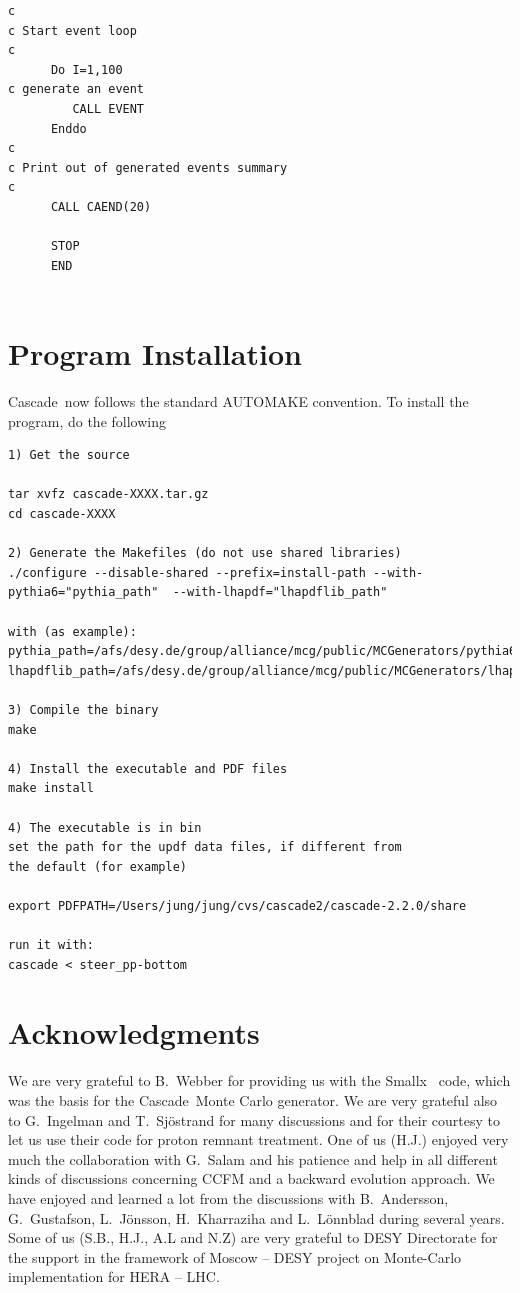 \documentclass[11pt]{article} \usepackage{mystyle-new}
\def\CASCADE{{\sc Cascade}}
\def\SMALLX{{\sc Smallx}}
\begin{document}
\begin{tiny}
\begin{verbatim}
c 
c Start event loop
c 
      Do I=1,100
c generate an event
         CALL EVENT
      Enddo
c 
c Print out of generated events summary
c 
      CALL CAEND(20)

      STOP
      END
             
\end{verbatim}
\end{tiny}
%   
\section{Program Installation}
\CASCADE\ now follows the standard AUTOMAKE
convention. To install the program, do the following
\begin{tiny}
\begin{verbatim}
1) Get the source

tar xvfz cascade-XXXX.tar.gz
cd cascade-XXXX

2) Generate the Makefiles (do not use shared libraries)
./configure --disable-shared --prefix=install-path --with-pythia6="pythia_path"  --with-lhapdf="lhapdflib_path"

with (as example):
pythia_path=/afs/desy.de/group/alliance/mcg/public/MCGenerators/pythia6/422/i586_rhel40
lhapdflib_path=/afs/desy.de/group/alliance/mcg/public/MCGenerators/lhapdf/5.8.1/i586_rhel40

3) Compile the binary
make

4) Install the executable and PDF files
make install 

4) The executable is in bin
set the path for the updf data files, if different from 
the default (for example)

export PDFPATH=/Users/jung/jung/cvs/cascade2/cascade-2.2.0/share

run it with:
cascade < steer_pp-bottom

\end{verbatim}
\end{tiny}
\section{Acknowledgments}
We are very grateful to B.~Webber for providing us with the \SMALLX~
code, which was the basis for the \CASCADE\ Monte Carlo generator.  
We are very grateful also to G.~Ingelman and T.~Sj\"ostrand for many discussions and for their courtesy to let us use their code for proton remnant treatment.
One of us (H.J.) enjoyed very much the collaboration with G.~Salam and his patience and help in all
different kinds of discussions concerning CCFM and a backward
evolution approach.
We have enjoyed and learned a lot from the discussions with
B.~Andersson, G.~Gustafson, L.~J\"onsson, H.~Kharraziha
and L.~L\"onnblad during several years.  
Some of us (S.B., H.J., A.L and N.Z)  are very grateful to 
DESY Directorate for the support in the 
framework of Moscow -- DESY project on Monte-Carlo
implementation for HERA -- LHC.
 
\end{document}
